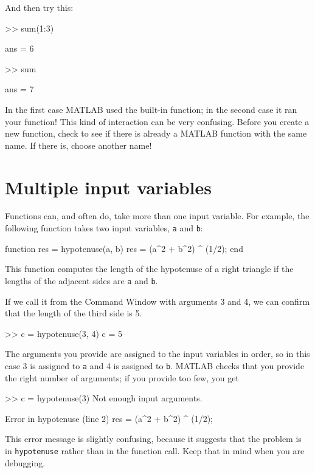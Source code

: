 \documentclass[
]{book}
\numberwithin{Answer}{chapter}
\numberwithin{Exercise}{chapter}
\begin{document}
And then try this:

\begin{code}
>> sum(1:3)

ans = 6

>> sum

ans = 7
\end{code}

In the first case MATLAB used the built-in function; in the second
case it ran your function!  This kind of interaction can be very
confusing.  Before you create a new function, check to see if there is
already a MATLAB function with the same name.  If there is, choose
another name!


\section{Multiple input variables}
\label{sect:hypotenuse}

Functions can, and often do, take more than one input variable.
For example, the following function takes two input variables,
{\tt a} and {\tt b}:

\begin{code}
function res = hypotenuse(a, b)
    res = (a^2 + b^2) ^ (1/2);
end
\end{code}
  
This function computes the length of the hypotenuse of a right
triangle if the lengths of the adjacent sides are {\tt a}
and {\tt b}.

If we call it from the Command Window with arguments 3 and 4, we can
confirm that the length of the third side is 5.

\begin{code}
>> c = hypotenuse(3, 4)
c = 5
\end{code}

The arguments you provide are assigned to the input variables in
order, so in this case 3 is assigned to {\tt a} and 4 is assigned to
{\tt b}.  MATLAB checks that you provide the right number of arguments;
if you provide too few, you get

\begin{code}
>> c = hypotenuse(3)
Not enough input arguments.

Error in hypotenuse (line 2)
    res = (a^2 + b^2) ^ (1/2);
\end{code}

This error message is slightly confusing, because it suggests that
the problem is in {\tt hypotenuse} rather than in the function call.
Keep that in mind when you are debugging.
\end{document}

